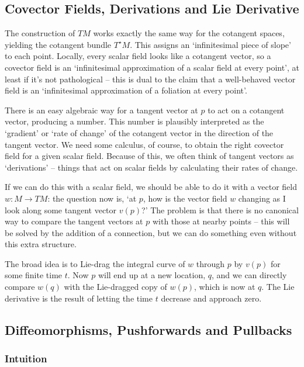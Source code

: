 \documentclass[oneside,english]{amsbook}
\numberwithin{section}{chapter}
\theoremstyle{plain}
\theoremstyle{definition}
\begin{document}
\subsection{Covector Fields, Derivations and Lie Derivative}

The construction of $TM$ works exactly the same way for the cotangent spaces, yielding the cotangent bundle $T^\star M$. This assigns an `infinitesimal piece of slope' to each point. Locally, every scalar field looks like a cotangent vector, so a covector field is an `infinitesimal approximation of a scalar field at every point', at least if it's not pathological -- this is dual to the claim that a well-behaved vector field is an `infinitesimal approximation of a foliation at every point'.

There is an easy algebraic way for a tangent vector at $p$ to act on a cotangent vector, producing a number. This number is plausibly interpreted as the `gradient' or `rate of change' of the cotangent vector in the direction of the tangent vector. We need some calculus, of course, to obtain the right covector field for a given scalar field. Because of this, we often think of tangent vectors as `derivations' -- things that act on scalar fields by calculating their rates of change.

If we can do this with a scalar field, we should be able to do it with a vector field $w:M\to TM$: the question now is, `at $p$, how is the vector field $w$ changing as I look along some tangent vector $v(p)$?' The problem is that there is no canonical way to compare the tangent vectors at $p$ with those at nearby points -- this will be solved by the addition of a connection, but we can do something even without this extra structure. 

The broad idea is to Lie-drag the integral curve of $w$ through $p$ by $v(p)$ for some finite time $t$. Now $p$ will end up at a new location, $q$, and we can directly compare $w(q)$ with the Lie-dragged copy of $w(p)$, which is now at $q$. The Lie derivative is the result of letting the time $t$ decrease and approach zero.

\subsection{Diffeomorphisms, Pushforwards and Pullbacks}

\subsubsection{Intuition}
\end{document}
